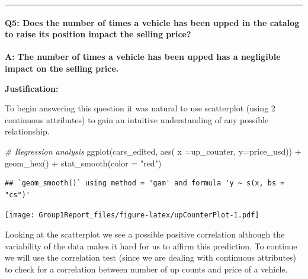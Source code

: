 \documentclass[
]{article}
\newenvironment{Shaded}{\begin{snugshade}}{\end{snugshade}}
\newcommand{\AttributeTok}[1]{\textcolor[rgb]{0.77,0.63,0.00}{#1}}
\newcommand{\CommentTok}[1]{\textcolor[rgb]{0.56,0.35,0.01}{\textit{#1}}}
\newcommand{\FunctionTok}[1]{\textcolor[rgb]{0.00,0.00,0.00}{#1}}
\newcommand{\NormalTok}[1]{#1}
\newcommand{\SpecialCharTok}[1]{\textcolor[rgb]{0.00,0.00,0.00}{#1}}
\newcommand{\StringTok}[1]{\textcolor[rgb]{0.31,0.60,0.02}{#1}}
\begin{document}
\begin{center}\rule{0.5\linewidth}{0.5pt}\end{center}

\hypertarget{q5-does-the-number-of-times-a-vehicle-has-been-upped-in-the-catalog-to-raise-its-position-impact-the-selling-price}{%
\paragraph{\texorpdfstring{\textbf{Q5:} Does the number of times a
vehicle has been upped in the catalog to raise its position impact the
selling
price?}{Q5: Does the number of times a vehicle has been upped in the catalog to raise its position impact the selling price?}}\label{q5-does-the-number-of-times-a-vehicle-has-been-upped-in-the-catalog-to-raise-its-position-impact-the-selling-price}}

\textbf{A:} \textbf{The number of times a vehicle has been upped has a
negligible impact on the selling price.}

\textbf{Justification:}

To begin answering this question it was natural to use scatterplot
(using 2 continuous attributes) to gain an intuitive understanding of
any possible relationship.

\begin{Shaded}
\begin{Highlighting}[]
\CommentTok{\# Regression analysis}
\FunctionTok{ggplot}\NormalTok{(cars\_edited, }\FunctionTok{aes}\NormalTok{( }\AttributeTok{x =}\NormalTok{up\_counter, }\AttributeTok{y=}\NormalTok{price\_usd)) }\SpecialCharTok{+} \FunctionTok{geom\_hex}\NormalTok{() }\SpecialCharTok{+} \FunctionTok{stat\_smooth}\NormalTok{(}\AttributeTok{color =} \StringTok{"red"}\NormalTok{)}
\end{Highlighting}
\end{Shaded}

\begin{verbatim}
## `geom_smooth()` using method = 'gam' and formula 'y ~ s(x, bs = "cs")'
\end{verbatim}

\texttt{[image: Group1Report\_files/figure-latex/upCounterPlot-1.pdf]}

Looking at the scatterplot we see a possible positive correlation
although the variability of the data makes it hard for us to affirm this
prediction. To continue we will use the correlation test (since we are
dealing with continuous attributes) to check for a correlation between
number of up counts and price of a vehicle.
\end{document}
